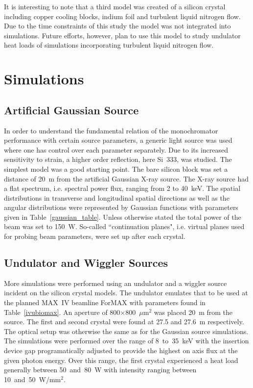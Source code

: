 \documentclass{iucr}
\begin{document}
It is interesting to note that a third model was created of a silicon crystal including copper cooling blocks, indium foil and turbulent liquid nitrogen flow. Due to the time constraints of this study the model was not integrated into simulations. Future efforts, however, plan to use this model to study undulator heat loads of simulations incorporating turbulent liquid nitrogen flow.

\section{Simulations}

\subsection{Artificial Gaussian Source}
In order to understand the fundamental relation of the monochromator performance with certain source parameters, a generic light source was used where one has control over each parameter separately. Due to its increased sensitivity to strain, a higher order reflection, here Si~333, was studied. The simplest model was a good starting point. The bare silicon block was set a distance of 20~m from the artificial Gaussian X-ray source. The X-ray source had a flat spectrum, i.e. spectral power flux, ranging from 2 to 40~keV. The spatial distributions in transverse and longitudinal spatial directions as well as the angular distributions were represented by Gaussian functions with parameters given in Table~\ref{gaussian_table}. Unless otherwise stated the total power of the beam was set to 150~W. So-called ``continuation planes", i.e. virtual planes used for probing beam parameters, were set up after each crystal.

\subsection{Undulator and Wiggler Sources}\label{undulatorsource}
More simulations were performed using an undulator and a wiggler source incident on the silicon crystal models. The undulator emulates that to be used at the planned MAX~IV beamline ForMAX with parameters found in Table~\ref{ivubiomax}. An aperture of 800$\times$800~$\mu$m$^2$ was placed 20~m from the source. The first and second crystal were found at 27.5 and 27.6~m respectively. The optical setup was otherwise the same as for the Gaussian source simulations. The simulations were performed over the range of 8~to~35~keV with the insertion device gap programatically adjusted to provide the highest on axis flux at the given photon energy. Over this range, the first crystal experienced a heat load generally between 50~and~80~W with intensity ranging between 10~and~50~W/mm$^2$. 
\end{document}
